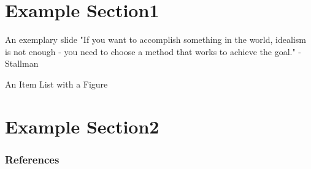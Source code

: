 \documentclass[10pt,aspectratio=169]{beamer}
\begin{document}

\title{\maintitle}
\disablefooter
\author{\FirstName~\LastName}
\institute{\Organisation \\
\href{\Website}{\Website}}%

\maketitle
\inserttoc

\enablefooter{\maintitle}

\section{Example Section1}

\begin{frame}{An exemplary slide}
"If you want to accomplish something in the world, idealism is not enough - you need to choose a method that works to achieve the goal." - Stallman \cite{refernce1,refernce2,refernce3,refernce4}
\end{frame}

\begin{frame}{An Item List with a Figure}
\end{frame}

\section{Example Section2}
\begin{frame}
\end{frame}

\begin{frame}[allowframebreaks]
\frametitle{References}
\footnotesize
%
%
\end{frame}
\end{document}
